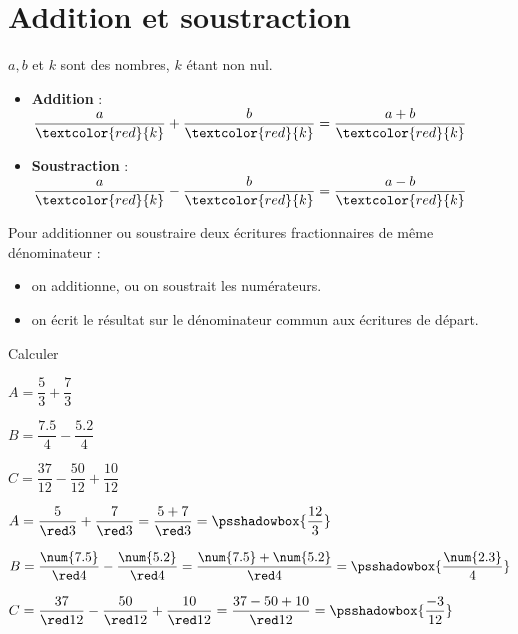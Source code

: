 \section{Addition et soustraction}

\begin{propriete}[\admise]
    $a, b$ et $k$ sont des nombres, $k$ étant non nul.
    \begin{itemize}
        \item \textcolor{B2}{\bf Addition} : $\dfrac{a}{\textcolor{red}{k}}+\dfrac{b}{\textcolor{red}{k}} = \dfrac{a+b}{\textcolor{red}{k}}$
        
        \smallskip
        \item \textcolor{B2}{\bf Soustraction} : $\dfrac{a}{\textcolor{red}{k}}-\dfrac{b}{\textcolor{red}{k}} = \dfrac{a-b}{\textcolor{red}{k}}$
    \end{itemize}
\end{propriete}


\begin{methode}
    Pour additionner ou soustraire deux écritures fractionnaires de même dénominateur :
    \begin{itemize}
        \item on additionne, ou on soustrait les numérateurs.
        \item on écrit le résultat sur le dénominateur commun aux écritures de départ.
    \end{itemize}
    \exercice
    Calculer
    \begin{list}{}{}
        \item $A=\dfrac{5}{3} + \dfrac{7}{3}$
        \item $B=\dfrac{\num{7.5}}{4} - \dfrac{\num{5.2}}{4}$
        \item $C=\dfrac{37}{12} - \dfrac{50}{12} + \dfrac{10}{12}$
    \end{list}
    \correction
    \begin{list}{}{}
        \item $A=\dfrac{5}{{\red 3}}  + \dfrac{7}{    {\red 3}} = \dfrac{5+7}{    {\red 3}} = \psshadowbox{\dfrac{12}{3}}$
        \item $B=\dfrac{\num{7.5}}{{\red 4}}  - \dfrac{\num{5.2}}{{\red 4}} = \dfrac{\num{7.5}+\num{5.2}}{{\red 4}} = \psshadowbox{\dfrac{\num{2.3}}{4}}$
        \item $C=\dfrac{37}{ {\red 12}} - \dfrac{50}{ {\red 12}} + \dfrac{10}{    {\red 12}} = \dfrac{37-50+10}{{\red 12}} = \psshadowbox{\dfrac{-3}{12}}$
    \end{list}
\end{methode}

